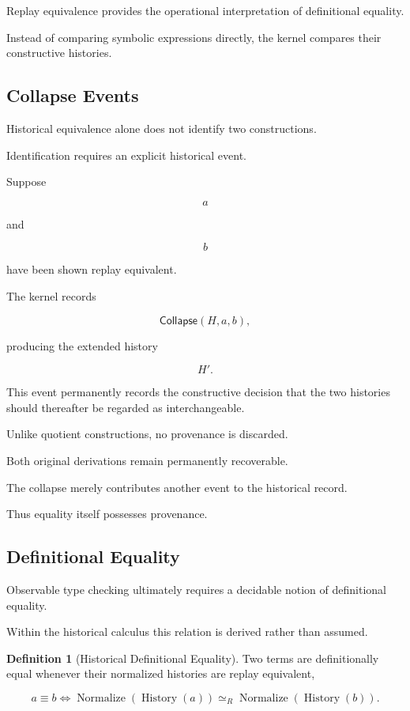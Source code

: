 \documentclass[12pt,oneside]{article}
\theoremstyle{definition}
\newtheorem{definition}[theorem]{Definition}
\theoremstyle{remark}
\newcommand{\Collapse}{\mathsf{Collapse}}
\DeclareMathOperator{\History}{History}
\DeclareMathOperator{\Normalize}{Normalize}
\begin{document}
Replay equivalence provides the operational interpretation of definitional
equality.

Instead of comparing symbolic expressions directly, the kernel compares their
constructive histories.

\subsection{Collapse Events}

Historical equivalence alone does not identify two constructions.

Identification requires an explicit historical event.

Suppose

\[
a
\]

and

\[
b
\]

have been shown replay equivalent.

The kernel records

\[
\Collapse(H,a,b),
\]

producing the extended history

\[
H'.
\]

This event permanently records the constructive decision that the two histories
should thereafter be regarded as interchangeable.

Unlike quotient constructions, no provenance is discarded.

Both original derivations remain permanently recoverable.

The collapse merely contributes another event to the historical record.

Thus equality itself possesses provenance.

\subsection{Definitional Equality}

Observable type checking ultimately requires a decidable notion of
definitional equality.

Within the historical calculus this relation is derived rather than assumed.

\begin{definition}[Historical Definitional Equality]

Two terms are definitionally equal whenever their normalized histories are
replay equivalent,

\[
a
\equiv
b
\Longleftrightarrow
\Normalize(\History(a))
\simeq_R
\Normalize(\History(b)).
\]

\end{definition}
\end{document}
